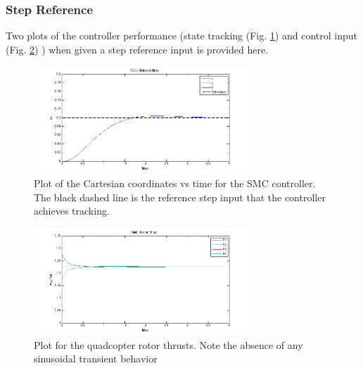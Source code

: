 \documentclass[conference]{IEEEtran}
\begin{document}
\subsubsection{Step Reference}
Two plots of the controller performance (state tracking (Fig. \ref{fig:smc_1})  and control input (Fig. \ref{fig:smc_2}) ) when given a step reference input is provided here.
\begin{figure}[!ht]
\centering
\includegraphics[width=3.2in]{../smc_1.png}
\caption{Plot of the Cartesian coordinates vs time for the SMC controller. The black dashed line is the reference step input that the controller achieves tracking.}
\label{fig:smc_1}
\end{figure}
\begin{figure}[!ht]
\centering
\includegraphics[width=3.2in]{../smc_2.png}
\caption{Plot for the quadcopter rotor thrusts. Note the absence of any sinusoidal transient behavior}
\label{fig:smc_2}
\end{figure}
\end{document}
